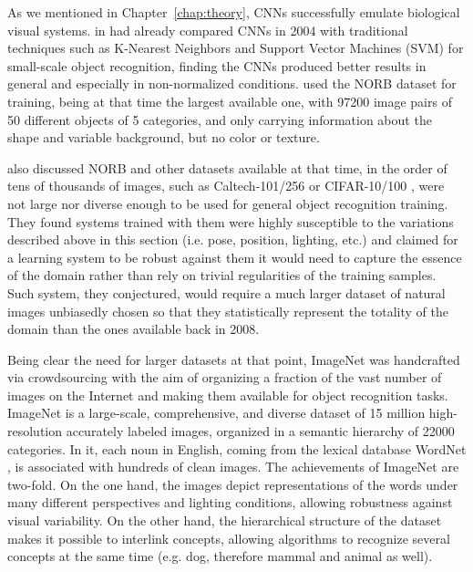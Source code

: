 As we mentioned in Chapter~\ref{chap:theory}, CNNs successfully emulate biological visual systems.
\citeauthor{LeCun2004B} in \cite{LeCun2004B} had already compared CNNs in 2004 with traditional techniques such as K-Nearest Neighbors and Support Vector Machines (SVM) for small-scale object recognition, finding the CNNs produced better results in general and especially in non-normalized conditions.
\citeauthor{LeCun2004B} used the NORB dataset for training, being at that time the largest available one, with 97200 image pairs of 50 different objects of 5 categories, and only carrying information about the shape and variable background, but no color or texture.

\citeauthor{Pinto2008} also discussed NORB and other datasets available at that time, in the order of tens of thousands of images, such as Caltech-101/256 \cite{Fei-Fei2007,Griffin2007} or CIFAR-10/100 \cite{Krizhevsky2009}, were not large nor diverse enough to be used for general object recognition training.
They found systems trained with them were highly susceptible to the variations described above in this section (i.e. pose, position, lighting, etc.) and claimed for a learning system to be robust against them it would need to capture the essence of the domain rather than rely on trivial regularities of the training samples.
Such system, they conjectured, would require a much larger dataset of natural images unbiasedly chosen so that they statistically represent the totality of the domain than the ones available back in 2008.

Being clear the need for larger datasets at that point, ImageNet \cite{Deng2009} was handcrafted via crowdsourcing with the aim of organizing a fraction of the vast number of images on the Internet and making them available for object recognition tasks.
ImageNet is a large-scale, comprehensive, and diverse dataset of 15 million high-resolution accurately labeled images, organized in a semantic hierarchy of 22000 categories.
In it, each noun in English, coming from the lexical database WordNet \cite{Wilkniss1998}, is associated with hundreds of clean images.
The achievements of ImageNet are two-fold.
On the one hand, the images depict representations of the words under many different perspectives and lighting conditions, allowing robustness against visual variability.
On the other hand, the hierarchical structure of the dataset makes it possible to interlink concepts, allowing algorithms to recognize several concepts at the same time (e.g. dog, therefore mammal and animal as well).

